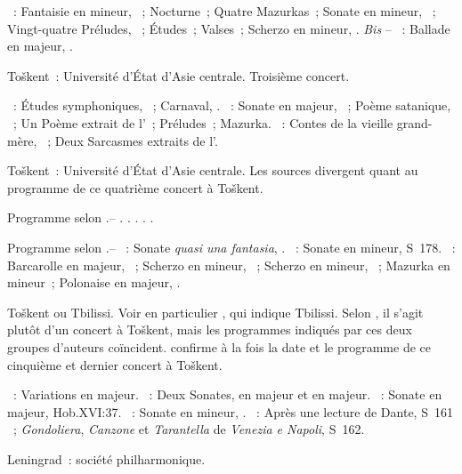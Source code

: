 \begin{description}
 \textsc{\Chopin{}}~: Fantaisie en \kF mineur, ~; Nocturne~; Quatre
 Mazurkas~; Sonate en \kB \Flat mineur, ~; Vingt-quatre Préludes,
 ~; Études~; Valses~; Scherzo en \kB mineur, .
 \emph{Bis} -- \textsc{\Chopin{}}~: Ballade en \kA \Flat majeur, .
 \item[\DateWithWeekDay{1932-09-30}]
 Toškent~: Université d'\hbox{État} d'\hbox{Asie} centrale.
 Troisième concert.

 \textsc{\Schumann{}}~: Études symphoniques, ~; Carnaval, .
 \textsc{\Scriabine{}}~: Sonate  en \kF \Sharp majeur, ~;
 Poème satanique, ~; Un Poème extrait de l'~; Préludes~;
 Mazurka.
 \textsc{\Prokofiev{}}~: Contes de la vieille grand-mère, ~; Deux
 Sarcasmes extraits de l'.
 \item[\DateWithWeekDay{1932-10-06}]
 Toškent~: Université d'\hbox{État} d'\hbox{Asie} centrale.
 Les sources divergent quant au programme de ce quatrième concert à Toškent.

 Programme selon \citet[p.~405]{Scriabine}.--
 \textsc{\Mendelssohn{}}.
 \textsc{\Haydn{}}.
 \textsc{\Schumann{}}.
 \textsc{\Prokofiev{}}.
 \textsc{\Scriabine{}}.

 Programme selon \citet[p.~155]{Nekrasova08}.--
 \textsc{\Beethoven{}}~: Sonate \emph{quasi una fantasia}, .
 \textsc{\Liszt{}}~: Sonate en \kB mineur, S~178.
 \textsc{\Chopin{}}~: Barcarolle en \kF \Sharp majeur, ~; Scherzo
 en \kB \Flat mineur, ~; Scherzo en \kC \Sharp mineur, ~;
 Mazurka en \kC \Sharp mineur~; Polonaise en \kA \Flat majeur, .
 \item[\DateWithWeekDay{1932-10-10}]
 Toškent ou Tbilissi.
 Voir en particulier \citet[p.~427]{Milshteyn82a}, qui indique Tbilissi.
 Selon \citet[p.~405]{Scriabine}, il s'agit plutôt d'un concert à Toškent,
 mais les programmes indiqués par ces deux groupes d'auteurs coïncident.
 \citet[p.~155]{Nekrasova08} confirme à la fois la date et le programme de
 ce cinquième et dernier concert à Toškent.

 \textsc{\Haendel{}}~: Variations en \kE majeur.
 \textsc{\Scarlatti{}}~: Deux Sonates, en \kA majeur et en \kD majeur.
 \textsc{\Haydn{}}~: Sonate en \kD majeur, Hob.XVI:37.
 \textsc{\Chopin{}}~: Sonate en \kB mineur, .
 \textsc{\Liszt{}}~: Après une lecture de Dante, S~161 ~;
 \emph{Gondoliera}, \emph{Canzone} et \emph{Tarantella} de \emph{Venezia e
 Napoli}, S~162.
 \item[\DateWithWeekDay{1932-10-24}]
 Leningrad~: société philharmonique.


\end{description}
